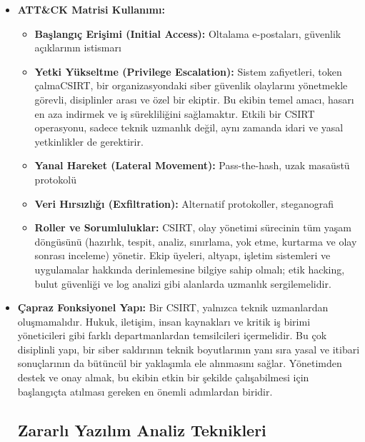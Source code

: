 \begin{itemize}
\begin{itemize}\end{itemize}

    \item \textbf{ATT\&CK Matrisi Kullanımı:}

    \begin{itemize}\subsection{Bilgisayar Güvenlik Olay Müdahale Ekibi (CSIRT) Yapısı}

        \item \textbf{Başlangıç Erişimi (Initial Access):} Oltalama e-postaları, güvenlik açıklarının istismarı

        \item \textbf{Yetki Yükseltme (Privilege Escalation):} Sistem zafiyetleri, token çalmaCSIRT, bir organizasyondaki siber güvenlik olaylarını yönetmekle görevli, disiplinler arası ve özel bir ekiptir. Bu ekibin temel amacı, hasarı en aza indirmek ve iş sürekliliğini sağlamaktır. Etkili bir CSIRT operasyonu, sadece teknik uzmanlık değil, aynı zamanda idari ve yasal yetkinlikler de gerektirir.

        \item \textbf{Yanal Hareket (Lateral Movement):} Pass-the-hash, uzak masaüstü protokolü

        \item \textbf{Veri Hırsızlığı (Exfiltration):} Alternatif protokoller, steganografi\begin{itemize}

    \end{itemize}    \item \textbf{Roller ve Sorumluluklar:} CSIRT, olay yönetimi sürecinin tüm yaşam döngüsünü (hazırlık, tespit, analiz, sınırlama, yok etme, kurtarma ve olay sonrası inceleme) yönetir. Ekip üyeleri, altyapı, işletim sistemleri ve uygulamalar hakkında derinlemesine bilgiye sahip olmalı; etik hacking, bulut güvenliği ve log analizi gibi alanlarda uzmanlık sergilemelidir.

\end{itemize}

    \item \textbf{Çapraz Fonksiyonel Yapı:} Bir CSIRT, yalnızca teknik uzmanlardan oluşmamalıdır. Hukuk, iletişim, insan kaynakları ve kritik iş birimi yöneticileri gibi farklı departmanlardan temsilcileri içermelidir. Bu çok disiplinli yapı, bir siber saldırının teknik boyutlarının yanı sıra yasal ve itibari sonuçlarının da bütüncül bir yaklaşımla ele alınmasını sağlar. Yönetimden destek ve onay almak, bu ekibin etkin bir şekilde çalışabilmesi için başlangıçta atılması gereken en önemli adımlardan biridir.

\subsection{Zararlı Yazılım Analiz Teknikleri}\end{itemize}

